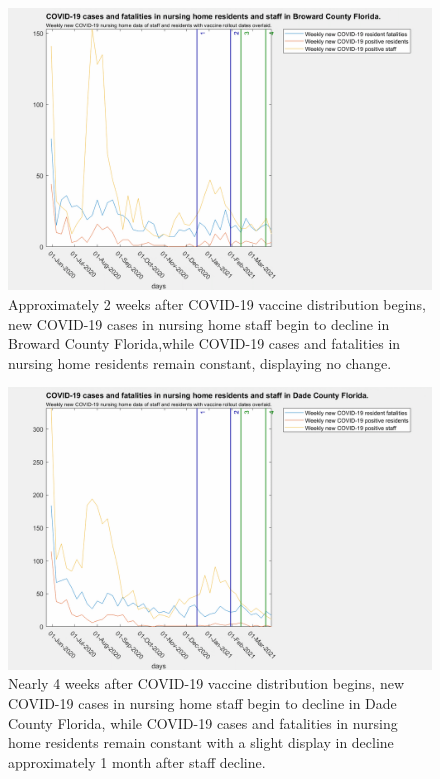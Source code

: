 \documentclass[twoside]{article}
\begin{document}
\begin{multicols}{2}
\begin{figure}[H]
	\includegraphics[width=\linewidth]{images/broward_nursing_home_with_vaccine.png}
	\caption{Approximately 2 weeks after COVID-19 vaccine distribution begins, new COVID-19 cases in nursing home staff begin to decline in Broward County Florida,while COVID-19 cases and fatalities in nursing home residents remain constant, displaying no change. }
	\label{fig:images/broward_nursing_home_with_vaccineLabel}
\end{figure}

\begin{figure}[H]
	\includegraphics[width=\linewidth]{images/dade_nursing_home_with_vaccine.png}
	\caption{Nearly 4 weeks after COVID-19 vaccine distribution begins, new COVID-19 cases in nursing home staff begin to decline in Dade County Florida, while COVID-19 cases and fatalities in nursing home residents remain constant with a slight display in decline approximately 1 month after staff decline. }
	\label{fig:images/dade_nursing_home_with_vaccineLabel}
\end{figure}


\end{multicols}
\end{document}
